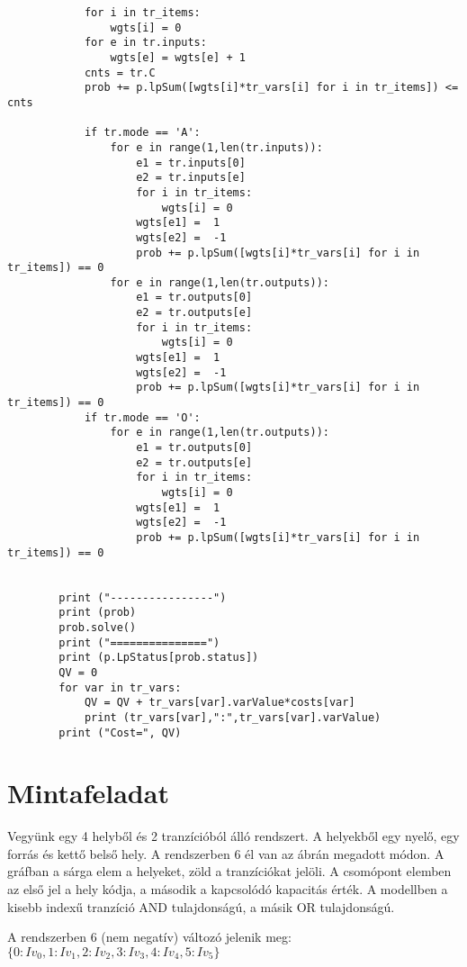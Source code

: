 \documentclass[12pt,a4paper]{book}
\begin{document}
\begin{verbatim}
            for i in tr_items:
                wgts[i] = 0
            for e in tr.inputs:
                wgts[e] = wgts[e] + 1
            cnts = tr.C
            prob += p.lpSum([wgts[i]*tr_vars[i] for i in tr_items]) <= cnts

            if tr.mode == 'A':
                for e in range(1,len(tr.inputs)):
                    e1 = tr.inputs[0]
                    e2 = tr.inputs[e]
                    for i in tr_items:
                        wgts[i] = 0
                    wgts[e1] =  1
                    wgts[e2] =  -1
                    prob += p.lpSum([wgts[i]*tr_vars[i] for i in tr_items]) == 0
                for e in range(1,len(tr.outputs)):
                    e1 = tr.outputs[0]
                    e2 = tr.outputs[e]
                    for i in tr_items:
                        wgts[i] = 0
                    wgts[e1] =  1
                    wgts[e2] =  -1
                    prob += p.lpSum([wgts[i]*tr_vars[i] for i in tr_items]) == 0
            if tr.mode == 'O':
                for e in range(1,len(tr.outputs)):
                    e1 = tr.outputs[0]
                    e2 = tr.outputs[e]
                    for i in tr_items:
                        wgts[i] = 0
                    wgts[e1] =  1
                    wgts[e2] =  -1
                    prob += p.lpSum([wgts[i]*tr_vars[i] for i in tr_items]) == 0
                    
            
        print ("----------------")
        print (prob)
        prob.solve()
        print ("===============")
        print (p.LpStatus[prob.status])
        QV = 0
        for var in tr_vars:
            QV = QV + tr_vars[var].varValue*costs[var]
            print (tr_vars[var],":",tr_vars[var].varValue)
        print ("Cost=", QV)
\end{verbatim}
\section{Mintafeladat}
Vegyünk egy 4 helyből és 2 tranzícióból álló rendszert. A helyekből egy nyelő, egy forrás és kettő belső hely. A rendszerben 6 él van az ábrán megadott módon.  A gráfban a sárga elem a helyeket, zöld a tranzíciókat jelöli. A csomópont elemben az első jel a hely kódja, a második a kapcsolódó kapacitás érték. A modellben a kisebb indexű tranzíció AND tulajdonságú, a másik OR tulajdonságú. 

A rendszerben 6 (nem negatív) változó jelenik meg:  $\{0: Iv_0, 1: Iv_1, 2: Iv_2, 3: Iv_3, 4: Iv_4, 5: Iv_5\}$
\end{document}
